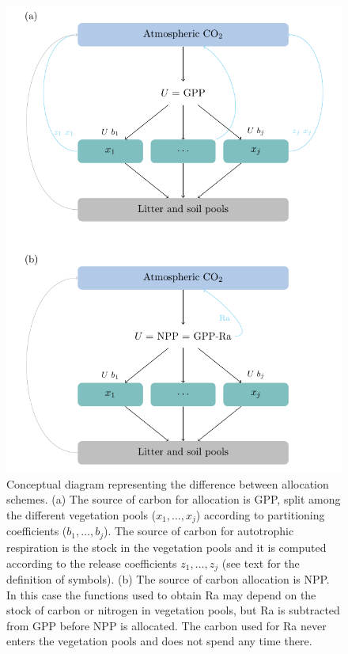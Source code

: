 \documentclass[bg, manuscript]{copernicus}
\begin{document}
\begin{figure}[t]
   \centering
   \includegraphics{diagram/conceptualDiagram.pdf} %
   \caption{Conceptual diagram representing the difference between allocation schemes. (a) The source of carbon for allocation is GPP, split among the different vegetation pools ($x_1, \dots , x_j$) according to partitioning coefficients ($b_1, \dots , b_j$). The source of carbon for autotrophic respiration is the stock in the vegetation pools and it is computed according to the release coefficients $z_1, \dots , z_j$ (see text for the definition of symbols). (b) The source of carbon allocation is NPP. In this case the functions used to obtain Ra may depend on the stock of carbon or nitrogen in vegetation pools, but Ra is subtracted from GPP before NPP is allocated. The carbon used for Ra never enters the vegetation pools and does not spend any time there.}
   \label{fig:concept}
\end{figure}
\end{document}
